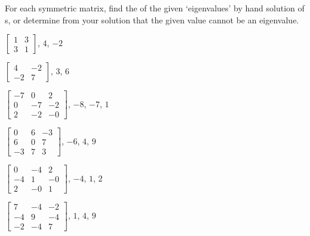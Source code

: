 \begin{exercise} 
For each symmetric matrix, find the  of the given `eigenvalues' by hand solution of s, or determine from your solution that the given value cannot be an eigenvalue.
\begin{Parts}
\item \(\begin{bmatrix} 1&3\\3&1 \end{bmatrix}\), \(4\), \(-2\)

\item \(\begin{bmatrix} 4&-2\\-2&7 \end{bmatrix}\), \(3\), \(6\)

\item \(\begin{bmatrix} -7 & 0 & 2
\\ 0 & -7 & -2
\\ 2 & -2 & -0 \end{bmatrix}\), \(-8\), \(-7\), \(1\)

\item \(\begin{bmatrix} 0 & 6 & -3
\\ 6 & 0 & 7
\\ -3 & 7 & 3 \end{bmatrix}\), \(-6\), \(4\), \(9\)

\begin{OmitV1}
\item \(\begin{bmatrix} 0 & -4 & 2
\\ -4 & 1 & -0
\\ 2 & -0 & 1 \end{bmatrix}\), \(-4\), \(1\), \(2\)

\item \(\begin{bmatrix} 7 & -4 & -2
\\ -4 & 9 & -4
\\ -2 & -4 & 7 \end{bmatrix}\), \(1\), \(4\), \(9\)
\end{OmitV1}
\end{Parts}
\end{exercise}



